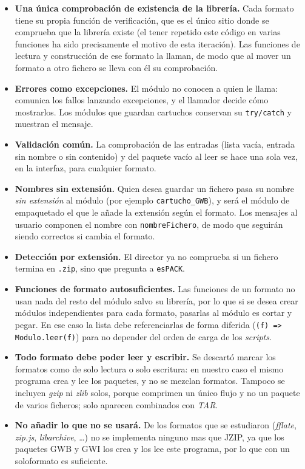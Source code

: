 \begin{itemize}
	\item \textbf{Una única comprobación de existencia de la librería.} Cada formato tiene su propia función de verificación, que es el único sitio donde se comprueba que la librería existe (el tener repetido este código en varias funciones ha sido precisamente el motivo de esta iteración). Las funciones de lectura y construcción de ese formato la llaman, de modo que al mover un formato a otro fichero se lleva con él su comprobación.
	
	\item \textbf{Errores como excepciones.} El módulo no conocen a quien le llama: comunica los fallos lanzando excepciones, y el llamador decide cómo mostrarlos. Los módulos que guardan cartuchos conservan su \texttt{try/catch} y muestran el mensaje.
	
	\item \textbf{Validación común.} La comprobación de las entradas (lista vacía, entrada sin nombre o sin contenido) y del paquete vacío al leer se hace una sola vez, en la interfaz, para cualquier formato.
	
	\item \textbf{Nombres sin extensión.} Quien desea guardar un fichero pasa su nombre \emph{sin extensión} al módulo (por ejemplo \texttt{cartucho\_GWB}), y será el módulo de empaquetado el que le añade la extensión según el formato. Los mensajes al usuario componen el nombre con \texttt{nombreFichero}, de modo que seguirán siendo correctos si cambia el formato.
	
	\item \textbf{Detección por extensión.} El director ya no comprueba si un fichero termina en \texttt{.zip}, sino que pregunta a \texttt{esPACK}.
	
	\item \textbf{Funciones de formato autosuficientes.} Las funciones de un formato no usan nada del resto del módulo salvo su librería, por lo que si se desea crear módulos independientes para cada formato, pasarlas al módulo es cortar y pegar. En ese caso la lista debe referenciarlas de forma diferida (\texttt{(f) => Modulo.leer(f)}) para no depender del orden de carga de los \emph{scripts}.
	
	\item \textbf{Todo formato debe poder leer y escribir.} Se descartó marcar los formatos como de solo lectura o solo escritura: en nuestro caso el mismo programa crea y lee los paquetes, y no se mezclan formatos. Tampoco se incluyen \emph{gzip} ni \emph{zlib} solos, porque comprimen un único flujo y no un paquete de varios ficheros; solo aparecen combinados con \emph{TAR}. 
	
	\item \textbf{No añadir lo que no se usará.} De los formatos que se estudiaron (\emph{fflate}, \emph{zip.js}, \emph{libarchive}, \dots) no se implementa ninguno mas que JZIP, ya que los paquetes GWB y GWI los crea y los lee este programa, por lo que con un soloformato es suficiente.
\end{itemize}

